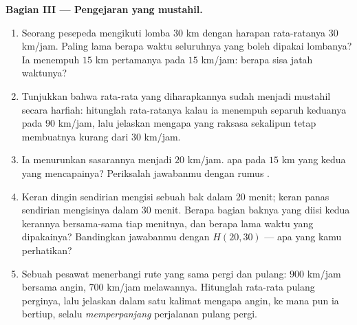 \begin{problem}
\medskip
\noindent\textbf{Bagian III --- Pengejaran yang mustahil.}
\begin{enumerate}[resume]
  \item Seorang pesepeda mengikuti lomba $30$ km dengan harapan
        rata-ratanya $30$ km/jam. Paling lama berapa waktu seluruhnya
        yang boleh dipakai lombanya? Ia menempuh $15$ km pertamanya
        pada $15$ km/jam: berapa sisa jatah waktunya?
  \item Tunjukkan bahwa rata-rata yang diharapkannya sudah menjadi
        mustahil secara harfiah: hitunglah  rata-ratanya
        kalau ia menempuh separuh keduanya pada $90$ km/jam, lalu
        jelaskan mengapa  yang raksasa sekalipun tetap
        membuatnya kurang dari
        $30$ km/jam.
  \item Ia menurunkan sasarannya menjadi $20$ km/jam.  apa
        pada $15$ km yang kedua yang mencapainya? Periksalah
        jawabanmu dengan rumus .
  \item Keran dingin sendirian mengisi sebuah bak dalam $20$ menit;
        keran panas sendirian mengisinya dalam $30$ menit. Berapa
        bagian baknya yang diisi kedua kerannya bersama-sama tiap
        menitnya, dan berapa lama waktu yang dipakainya?
        Bandingkan jawabanmu dengan $H(20, 30)$ --- apa yang kamu
        perhatikan?
  \item Sebuah pesawat menerbangi rute yang sama pergi dan pulang:
        $900$ km/jam bersama angin, $700$ km/jam melawannya.
        Hitunglah  rata-rata pulang perginya, lalu jelaskan
        dalam satu kalimat mengapa angin, ke mana pun ia bertiup,
        selalu \emph{memperpanjang} perjalanan pulang pergi.

\end{enumerate}
\end{problem}
